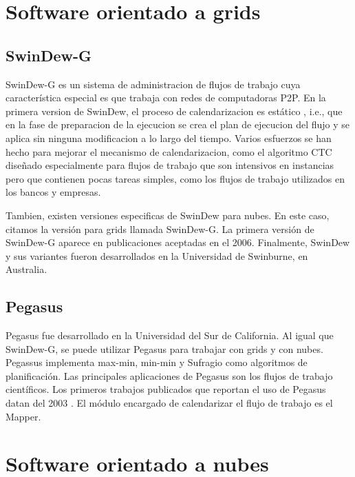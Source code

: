 \section{Software orientado a grids}

\subsection{SwinDew-G}


SwinDew-G \cite{yang2007peer} es un sistema de administracion de flujos de trabajo cuya característica especial es que trabaja con redes de computadoras P2P. En la primera version de SwinDew, el proceso de calendarizacion es estático \cite{yang2007peer}, i.e., que en la fase de preparacion de la ejecucion se crea el plan de ejecucion del flujo y se aplica sin ninguna modificacion a lo largo del tiempo. Varios esfuerzos se han hecho para mejorar el mecanismo de calendarizacion, como el algoritmo CTC \cite{liu2010compromised} diseñado especialmente para flujos de trabajo que son intensivos en instancias pero que contienen pocas tareas simples, como los flujos de trabajo utilizados en los bancos y empresas.

Tambien, existen versiones especificas de SwinDew para nubes. En este caso, citamos la versión para grids llamada SwinDew-G. La primera versión de SwinDew-G aparece en publicaciones aceptadas en el 2006. Finalmente, SwinDew y sus variantes fueron desarrollados en la Universidad de Swinburne, en Australia.

\subsection{Pegasus}

Pegasus \cite{deelman2005pegasus} fue desarrollado en la Universidad del Sur de California. Al igual que SwinDew-G, se puede utilizar Pegasus para trabajar con grids y con nubes. Pegassus implementa max-min, min-min y Sufragio como algoritmos de planificación. Las principales aplicaciones de Pegasus son los flujos de trabajo científicos. Los primeros trabajos publicados que reportan el uso de Pegasus datan del 2003 \cite{pegasus2014publications}. El módulo encargado de calendarizar el flujo de trabajo es el Mapper.

\section{Software orientado a nubes}

